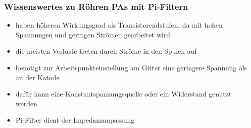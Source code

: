 \begin{frame}
\frametitle{Wissenswertes zu Röhren PAs mit Pi-Filtern}
\begin{center}
  \begin{itemize}
    \item haben höheren Wirkungsgrad als Transistorendstufen, da mit hohen Spannungen und geringen Strömen gearbeitet wird
    \item die meisten Verluste treten durch Ströme in den Spulen auf
    \item benötigt zur Arbeitspunkteinstellung am Gitter eine geringere Spannung als an der Katode
    \item dafür kann eine Konstantspannungsquelle oder ein Widerstand genutzt werden
    \item Pi-Filter dient der Impedanzanpassung
  \end{itemize}
\end{center}
\end{frame}

